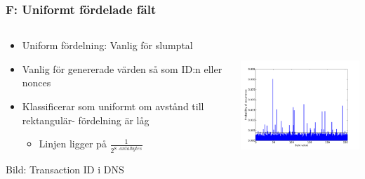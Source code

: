 \documentclass[xetex, 8pt]{beamer}
\begin{document}
    \begin{frame}
        \frametitle{F: Uniformt fördelade fält}
        \begin{columns}[t]
            \begin{column}[T]{6cm}
                \begin{itemize}
                    \item Uniform fördelning: Vanlig för slumptal
                    \item Vanlig för genererade värden så som ID:n eller nonces
                    \item Klassificerar som uniformt om avstånd till 
                        rektangulär- fördelning är låg
                        \begin{itemize}
                            \item Linjen ligger på $\frac{1}{2^{8 \cdot antal bytes}}$
                        \end{itemize}
                \end{itemize}
                Bild: Transaction ID i DNS
            \end{column}
            \begin{column}[T]{6cm}
                \includegraphics[height=5cm]{img/uniform.pdf}
            \end{column}
        \end{columns}
    \end{frame}
\end{document}
